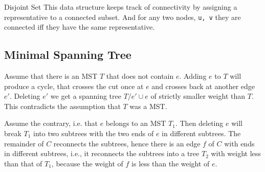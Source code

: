 \begin{enumerate}[wide=0em, label=\arabic*, itemsep=0pt, parsep=0pt,
    font=\footnotesize\bfseries] 
\end{enumerate}



{Disjoint Set}{
    This data structure keeps track of connectivity by assigning a
    representative to a connected subset. And for any two nodes, \texttt{u, v}
    they are connected iff they have the same representative.
}


\subsection{Minimal Spanning Tree}


\begin{minipage}{.5\linewidth}
\end{minipage}\hfill%
\begin{minipage}{.4\linewidth}
\end{minipage}




\begin{prooof}
    Assume that there is an MST $T$ that does not contain $e$. Adding $e$ to
    $T$ will produce a cycle, that crosses the cut once at $e$ and crosses
    back at another edge $e'$. Deleting $e'$ we get a spanning tree
    $T/{e'}\cup{e}$ of strictly smaller weight than $T$. This contradicts the
    assumption that $T$ was a MST. 
\end{prooof}


\begin{prooof}
    Assume the contrary, i.e. that $e$ belongs to an MST $T_1$. Then deleting
    $e$ will break $T_1$ into two subtrees with the two ends of $e$ in
    different subtrees. The remainder of $C$ reconnects the subtrees, hence
    there is an edge $f$ of $C$ with ends in different subtrees, i.e., it
    reconnects the subtrees into a tree $T_2$ with weight less than that of
    $T_1$, because the weight of $f$ is less than the weight of $e$.
\end{prooof}



